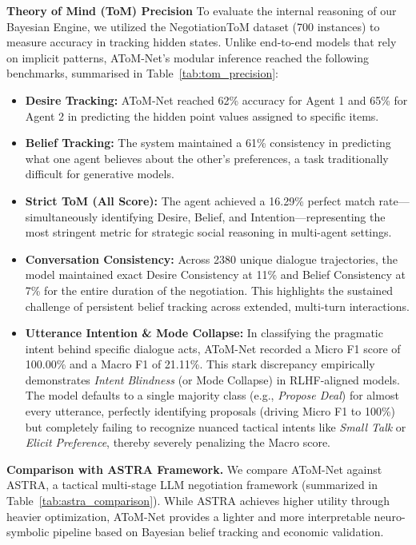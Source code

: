 \documentclass[11pt]{article}
\begin{document}
\textbf{Theory of Mind (ToM) Precision}
To evaluate the internal reasoning of our Bayesian Engine, we utilized the NegotiationToM dataset
(700 instances) to measure accuracy in tracking hidden states. Unlike end-to-end models that rely
on implicit patterns, AToM-Net's modular inference reached the following benchmarks, summarised
in Table~\ref{tab:tom_precision}:
\begin{itemize}
    \item \textbf{Desire Tracking:} AToM-Net reached 62\% accuracy for Agent 1 and 65\%
          for Agent 2 in predicting the hidden point values assigned to specific items.
    \item \textbf{Belief Tracking:} The system maintained a 61\% consistency in predicting
          what one agent believes about the other's preferences, a task traditionally difficult
          for generative models.
    \item \textbf{Strict ToM (All Score):} The agent achieved a 16.29\% perfect match
          rate—simultaneously identifying Desire, Belief, and Intention—representing the most
          stringent metric for strategic social reasoning in multi-agent settings.
    \item \textbf{Conversation Consistency:} Across 2380 unique dialogue trajectories, the model
          maintained exact Desire Consistency at 11\% and Belief Consistency at 7\% for the
          entire duration of the negotiation. This highlights the sustained challenge of persistent
          belief tracking across extended, multi-turn interactions.
    \item \textbf{Utterance Intention \& Mode Collapse:} In classifying the pragmatic intent behind specific dialogue acts, AToM-Net recorded a Micro F1 score of 100.00\% and a Macro F1 of 21.11\%. This stark discrepancy empirically demonstrates \textit{Intent Blindness} (or Mode Collapse) in RLHF-aligned models. The model defaults to a single majority class (e.g., \textit{Propose Deal}) for almost every utterance, perfectly identifying proposals (driving Micro F1 to 100\%) but completely failing to recognize nuanced tactical intents like \textit{Small Talk} or \textit{Elicit Preference}, thereby severely penalizing the Macro score.
\end{itemize}

\textbf{Comparison with ASTRA Framework.}
We compare AToM-Net against ASTRA, a tactical multi-stage LLM negotiation framework (summarized in Table~\ref{tab:astra_comparison}). While ASTRA achieves higher utility through heavier optimization, AToM-Net provides a lighter and more interpretable neuro-symbolic pipeline based on Bayesian belief tracking and economic validation.
\end{document}
